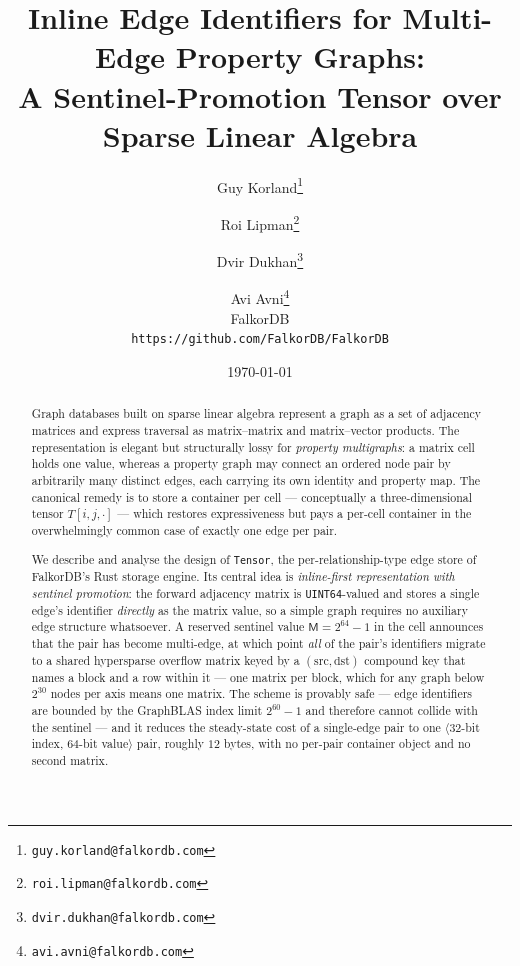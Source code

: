 \documentclass[11pt,a4paper]{article}
\title{\textbf{Inline Edge Identifiers for Multi-Edge Property Graphs:\\
A Sentinel-Promotion Tensor over Sparse Linear Algebra}}
\author{%
Guy Korland\thanks{\texttt{guy.korland@falkordb.com}} \and
Roi Lipman\thanks{\texttt{roi.lipman@falkordb.com}} \and
Dvir Dukhan\thanks{\texttt{dvir.dukhan@falkordb.com}} \and
Avi Avni\thanks{\texttt{avi.avni@falkordb.com}}
\\[0.6em]
FalkorDB\\
\small\texttt{https://github.com/FalkorDB/FalkorDB}}
\date{\today}
\theoremstyle{plain}
\theoremstyle{definition}
\theoremstyle{remark}
\newcommand{\M}{\mathsf{M}}
\begin{document}
\maketitle

\begin{abstract}
Graph databases built on sparse linear algebra represent a graph as a set of
adjacency matrices and express traversal as matrix--matrix and
matrix--vector products. The representation is elegant but structurally
lossy for \emph{property multigraphs}: a matrix cell holds one value, whereas
a property graph may connect an ordered node pair by arbitrarily many
distinct edges, each carrying its own identity and property map. The
canonical remedy is to store a container per cell --- conceptually a
three-dimensional tensor $T[i,j,\cdot]$ --- which restores expressiveness
but pays a per-cell container in the overwhelmingly common case of exactly
one edge per pair.

We describe and analyse the design of \texttt{Tensor}, the per-relationship-type
edge store of FalkorDB's Rust storage engine. Its central idea is
\emph{inline-first representation with sentinel promotion}: the forward
adjacency matrix is \texttt{UINT64}-valued and stores a single edge's
identifier \emph{directly} as the matrix value, so a simple graph requires no
auxiliary edge structure whatsoever. A reserved sentinel value $\M = 2^{64}-1$
in the cell announces that the pair has become multi-edge, at which point
\emph{all} of the pair's identifiers migrate to a shared hypersparse overflow
matrix keyed by a $(\text{src},\text{dst})$ compound key that names a block and a
row within it --- one matrix per block, which for any graph below $2^{30}$ nodes
per axis means one matrix.
The scheme is provably safe --- edge identifiers are bounded by the GraphBLAS
index limit $2^{60}-1$ and therefore cannot collide with the sentinel --- and
it reduces the steady-state cost of a single-edge pair to one $\langle$32-bit
index, 64-bit value$\rangle$ pair, roughly $12$ bytes, with no per-pair
container object and no second matrix.


\end{abstract}
\end{document}
